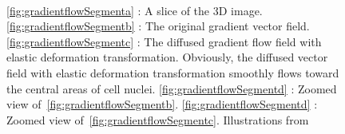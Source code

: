 \begin{figure}[h]
  \centering
  \captionsetup[subfloat]{labelformat=empty}
  \\
\caption{%
\ref{fig:gradientflowSegmenta} : A slice of the 3D image.
\ref{fig:gradientflowSegmentb} : The original gradient vector field.
\ref{fig:gradientflowSegmentc} : The diffused gradient flow field with elastic deformation transformation. Obviously, the diffused vector field with elastic deformation transformation smoothly flows toward the central areas of cell nuclei. 
\ref{fig:gradientflowSegmentd} : Zoomed view of~\ref{fig:gradientflowSegmentb}.
\ref{fig:gradientflowSegmentd} : Zoomed view of~\ref{fig:gradientflowSegmentc}.
Illustrations from \cite{li20073}}
  \label{fig:gradientflowIllustration}
\end{figure}
\clearpage

